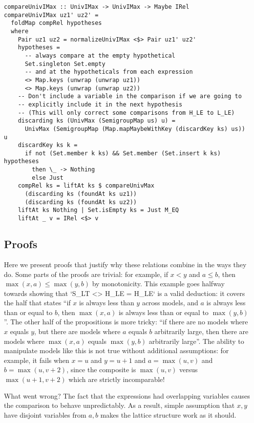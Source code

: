 \documentclass[11pt, twoside, reqno]{book}
\begin{document}
\begin{verbatim}
compareUnivIMax :: UnivIMax -> UnivIMax -> Maybe IRel
compareUnivIMax uz1' uz2' =
  foldMap compRel hypotheses
  where
    Pair uz1 uz2 = normalizeUnivIMax <$> Pair uz1' uz2'
    hypotheses =
      -- always compare at the empty hypothetical
      Set.singleton Set.empty
      -- and at the hypotheticals from each expression
      <> Map.keys (unwrap (unwrap uz1))
      <> Map.keys (unwrap (unwrap uz2))
    -- Don't include a variable in the comparison if we are going to
    -- explicitly include it in the next hypothesis
    -- (This will only correct some comparisons from H_LE to L_LE)
    discarding ks (UnivMax (SemigroupMap us) u) =
      UnivMax (SemigroupMap (Map.mapMaybeWithKey (discardKey ks) us)) u
    discardKey ks k =
      if not (Set.member k ks) && Set.member (Set.insert k ks) hypotheses
        then \_ -> Nothing
        else Just
    compRel ks = liftAt ks $ compareUnivMax
      (discarding ks (foundAt ks uz1))
      (discarding ks (foundAt ks uz2))
    liftAt ks Nothing | Set.isEmpty ks = Just M_EQ
    liftAt _ v = IRel <$> v
\end{verbatim}

\subsection{Proofs}
Here we present proofs that justify why these relations combine in the ways they do.
Some parts of the proofs are trivial: for example, if \(x < y\) and \(a \le b\), then \(\max(x,a) \le \max(y,b)\) by monotonicity.
This example goes halfway towards showing that \inHS`S_LT <> H_LE = H_LE` is a valid deduction: it covers the half that states ``if \(x\) is always less than \(y\) across models, and \(a\) is always less than or equal to \(b\), then \(\max(x,a)\) is always less than or equal to \(\max(y,b)\)''.
The other half of the propositions is more tricky: ``if there are no models where \(x\) equals \(y\), but there are models where \(a\) equals \(b\) arbitrarily large, then there are models where \(\max(x,a)\) equals \(\max(y,b)\) arbitrarily large''.
The ability to manipulate models like this is not true without additional assumptions: for example, it fails when \(x = u\) and \(y = u+1\) and \(a = \max(u, v)\) and \(b = \max(u, v+2)\), since the composite is \(\max(u, v)\) versus \(\max(u+1, v+2)\) which are strictly incomparable!

What went wrong? The fact that the expressions had overlapping variables causes the comparison to behave unpredictably.
As a result, simple assumption that \(x, y\) have disjoint variables from \(a, b\) makes the lattice structure work as it should.
\end{document}
